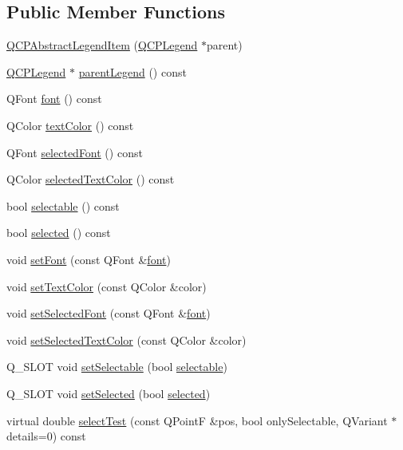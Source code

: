 \subsection*{Public Member Functions}
\begin{DoxyCompactItemize}
\item 
\hyperlink{class_q_c_p_abstract_legend_item_afaff87610e8da0fa238ecf552872d774}{Q\+C\+P\+Abstract\+Legend\+Item} (\hyperlink{class_q_c_p_legend}{Q\+C\+P\+Legend} $\ast$parent)
\item 
\hyperlink{class_q_c_p_legend}{Q\+C\+P\+Legend} $\ast$ \hyperlink{class_q_c_p_abstract_legend_item_afcd683e43058f99a47d6546eedffc5c1}{parent\+Legend} () const 
\item 
Q\+Font \hyperlink{class_q_c_p_abstract_legend_item_ae476404706638d84fadc01021df2b19e}{font} () const 
\item 
Q\+Color \hyperlink{class_q_c_p_abstract_legend_item_a444caef8565ac8d8653269f14d82b42d}{text\+Color} () const 
\item 
Q\+Font \hyperlink{class_q_c_p_abstract_legend_item_afccfe665eb8483cec924a9c0a53ddf2b}{selected\+Font} () const 
\item 
Q\+Color \hyperlink{class_q_c_p_abstract_legend_item_a076db1717257b82875b12a15ecf99ba3}{selected\+Text\+Color} () const 
\item 
bool \hyperlink{class_q_c_p_abstract_legend_item_a0a0205f33f37edae50826c24cb8f1983}{selectable} () const 
\item 
bool \hyperlink{class_q_c_p_abstract_legend_item_ac776e68e3367704452131c6aa9908bb9}{selected} () const 
\item 
void \hyperlink{class_q_c_p_abstract_legend_item_a409c53455d8112f71d70c0c43eb10265}{set\+Font} (const Q\+Font \&\hyperlink{class_q_c_p_abstract_legend_item_ae476404706638d84fadc01021df2b19e}{font})
\item 
void \hyperlink{class_q_c_p_abstract_legend_item_a6ebace6aaffaedcdab2d74e88acc2d1e}{set\+Text\+Color} (const Q\+Color \&color)
\item 
void \hyperlink{class_q_c_p_abstract_legend_item_a91db5aee48617a9d3206e61376807365}{set\+Selected\+Font} (const Q\+Font \&\hyperlink{class_q_c_p_abstract_legend_item_ae476404706638d84fadc01021df2b19e}{font})
\item 
void \hyperlink{class_q_c_p_abstract_legend_item_a4d01d008ee1a5bfe9905b0397a421936}{set\+Selected\+Text\+Color} (const Q\+Color \&color)
\item 
Q\+\_\+\+S\+L\+O\+T void \hyperlink{class_q_c_p_abstract_legend_item_a9913ef48730551b696e7f98a2391c599}{set\+Selectable} (bool \hyperlink{class_q_c_p_abstract_legend_item_a0a0205f33f37edae50826c24cb8f1983}{selectable})
\item 
Q\+\_\+\+S\+L\+O\+T void \hyperlink{class_q_c_p_abstract_legend_item_a6eed93b0ab99cb3eabb043fb08179c2b}{set\+Selected} (bool \hyperlink{class_q_c_p_abstract_legend_item_ac776e68e3367704452131c6aa9908bb9}{selected})
\item 
virtual double \hyperlink{class_q_c_p_abstract_legend_item_ad0480d5cad34627a294a2921caa4a62f}{select\+Test} (const Q\+Point\+F \&pos, bool only\+Selectable, Q\+Variant $\ast$details=0) const 
\end{DoxyCompactItemize}

